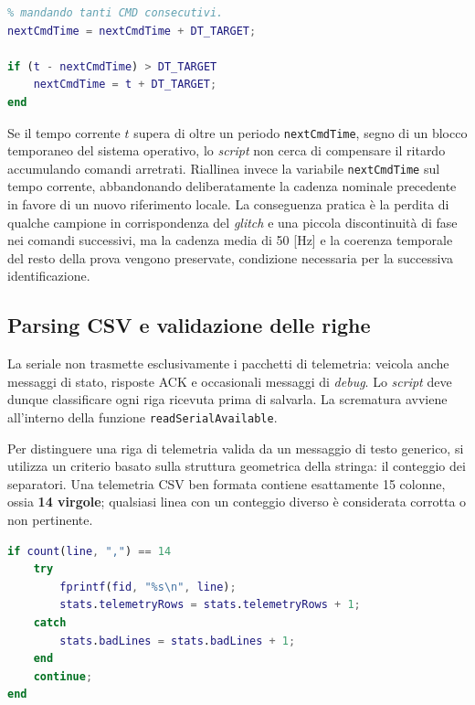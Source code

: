 \documentclass[11pt]{report}
\begin{document}
	\begin{lstlisting}[language=Matlab, caption={Scheduling anti-burst}]
% Scheduling anti-burst: se MATLAB resta indietro, non recupera
% mandando tanti CMD consecutivi.
nextCmdTime = nextCmdTime + DT_TARGET;

if (t - nextCmdTime) > DT_TARGET
    nextCmdTime = t + DT_TARGET;
end
	\end{lstlisting}
	
	Se il tempo corrente $t$ supera di oltre un periodo \texttt{nextCmdTime}, segno di un blocco temporaneo del sistema operativo, lo \textit{script} non cerca di compensare il ritardo accumulando comandi arretrati. Riallinea invece la variabile \texttt{nextCmdTime} sul tempo corrente, abbandonando deliberatamente la cadenza nominale precedente in favore di un nuovo riferimento locale. La conseguenza pratica è la perdita di qualche campione in corrispondenza del \textit{glitch} e una piccola discontinuità di fase nei comandi successivi, ma la cadenza media di 50 [Hz] e la coerenza temporale del resto della prova vengono preservate, condizione necessaria per la successiva identificazione.
	
	\subsection{Parsing CSV e validazione delle righe}
	La seriale non trasmette esclusivamente i pacchetti di telemetria: veicola anche messaggi di stato, risposte ACK e occasionali messaggi di \textit{debug}. Lo \textit{script} deve dunque classificare ogni riga ricevuta prima di salvarla. La scrematura avviene all'interno della funzione \texttt{readSerialAvailable}.
	
	Per distinguere una riga di telemetria valida da un messaggio di testo generico, si utilizza un criterio basato sulla struttura geometrica della stringa: il conteggio dei separatori. Una telemetria CSV ben formata contiene esattamente 15 colonne, ossia \textbf{14 virgole}; qualsiasi linea con un conteggio diverso è considerata corrotta o non pertinente.
	
	\begin{lstlisting}[language=Matlab, caption={Validazione delle righe di telemetria tramite conteggio dei separatori}]
% Telemetria CSV valida: 15 colonne = 14 virgole.
if count(line, ",") == 14
    try
        fprintf(fid, "%s\n", line);
        stats.telemetryRows = stats.telemetryRows + 1;
    catch
        stats.badLines = stats.badLines + 1;
    end
    continue;
end
	\end{lstlisting}
	
\end{document}
